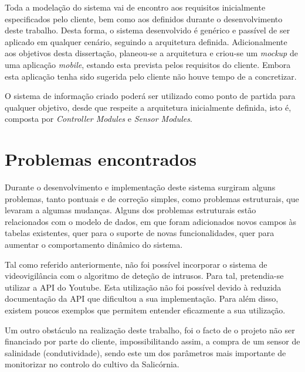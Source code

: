 Toda a modelação do sistema vai de encontro aos requisitos inicialmente especificados pelo cliente, bem como aos definidos durante o desenvolvimento deste trabalho. Desta forma, o sistema desenvolvido é genérico e passível de ser aplicado em qualquer cenário, seguindo a arquitetura definida. Adicionalmente aos objetivos desta dissertação, planeou-se a arquitetura e criou-se um \textit{mockup} de uma aplicação \textit{mobile}, estando esta prevista pelos requisitos do cliente. Embora esta aplicação tenha sido sugerida pelo cliente não houve tempo de a concretizar. 


O sistema de informação criado poderá ser utilizado como ponto de partida para qualquer objetivo, desde que respeite a arquitetura inicialmente definida, isto é, composta por \textit{Controller Modules} e \textit{Sensor Modules}. 



\section{Problemas encontrados}


Durante o desenvolvimento e implementação deste sistema surgiram alguns problemas, tanto pontuais e de correção simples, como
problemas estruturais, que levaram a algumas mudanças. Alguns dos problemas estruturais estão relacionados com o modelo de dados, em que foram adicionados novos campos às tabelas existentes, quer para o suporte de novas funcionalidades, quer para aumentar o comportamento dinâmico do sistema.


Tal como referido anteriormente, não foi possível incorporar o sistema de videovigilância com o algoritmo de deteção de intrusos. Para tal, pretendia-se utilizar a \ac{API} do Youtube. Esta utilização não foi possível devido à reduzida documentação da \ac{API} que dificultou a sua implementação. Para além disso, existem poucos exemplos que permitem entender eficazmente a sua utilização. 

Um outro obstáculo na realização deste trabalho, foi o facto de o projeto não ser financiado por parte do cliente, impossibilitando assim, a compra de um sensor de salinidade (condutividade), sendo este um dos parâmetros mais importante de monitorizar no controlo do cultivo da Salicórnia. 







